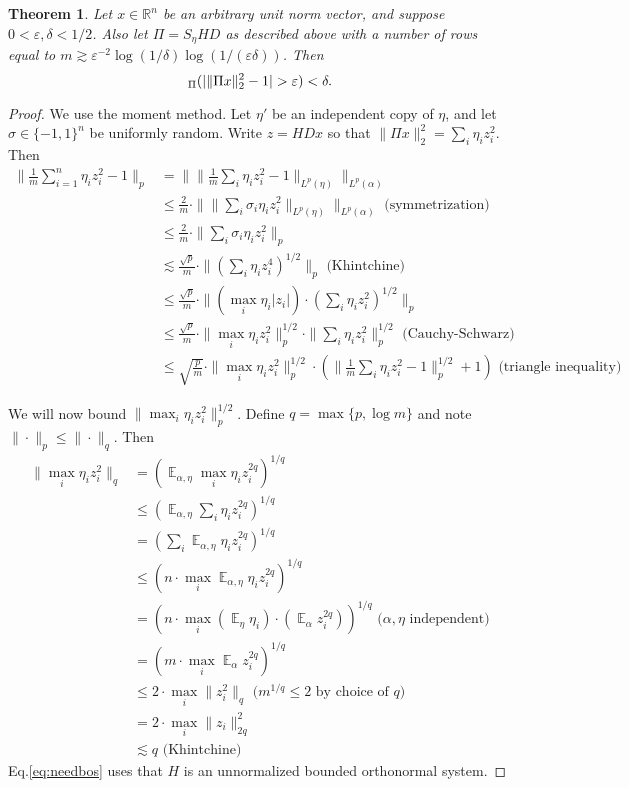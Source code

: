 \documentclass[12pt]{article}
\DeclareMathOperator*{\E}{\mathbb{E}}
\let\Pr\relax
\DeclareMathOperator*{\Pr}{\mathbb{P}}
\newcommand{\eps}{\varepsilon}
\newcommand{\R}{\mathbb{R}}
\newtheorem{theorem}{Theorem}
\newcommand{\EquationName}[1]{\label{eq:#1}}
\newcommand{\TheoremName}[1]{\label{thm:#1}}
\newcommand{\Equation}[1]{Eq.\:\eqref{eq:#1}}
\begin{document}
\begin{theorem}\TheoremName{fjlt}
Let $x\in\R^n$ be an arbitrary unit norm vector, and suppose $0 < \eps, \delta < 1/2$. Also let $\Pi = S_\eta H D$ as described above with a number of rows equal to $m\gtrsim \eps^{-2}\log(1/\delta)\log(1/(\eps\delta))$. Then
$$
\Pr_\Pi(| \|\Pi x\|_2^2 - 1 | > \eps ) < \delta .
$$
\end{theorem}
\begin{proof}
We use the moment method. Let $\eta'$ be an independent copy of $\eta$, and let $\sigma\in\{-1,1\}^n$ be uniformly random. Write $z = HDx$ so that $\|\Pi x\|_2^2 = \sum_i \eta_i z_i^2$. Then
\allowdisplaybreaks
\begin{align}
\|\frac 1m\sum_{i=1}^n \eta_i z_i^2 - 1\|_p &= \|\|\frac 1m\sum_i \eta_i z_i^2 - 1\|_{L^p(\eta)}\|_{L^p(\alpha)} \EquationName{sqrtfjlt1}\\
\nonumber {} &\le \frac 2m\cdot \|\|\sum_i \sigma_i \eta_i z_i^2\|_{L^p(\eta)}\|_{L^p(\alpha)}\text{ (symmetrization)}\\
\nonumber {} &\le \frac 2m\cdot \|\sum_i \sigma_i \eta_i z_i^2\|_p\\
\nonumber {}&\lesssim \frac{\sqrt{p}}m\cdot \|(\sum_i \eta_i z_i^4)^{1/2}\|_p \text{ (Khintchine)}\\
\nonumber {}&\le \frac{\sqrt{p}}m\cdot \|(\max_i \eta_i |z_i|) \cdot (\sum_i \eta_i z_i^2)^{1/2}\|_p\\
\nonumber {}&\le \frac{\sqrt{p}}m\cdot \|\max_i \eta_i z_i^2\|_p^{1/2} \cdot \|\sum_i \eta_i z_i^2\|_p^{1/2}\text{ (Cauchy-Schwarz)}\\
{}&\le \sqrt{\frac pm} \cdot \|\max_i \eta_i z_i^2\|_p^{1/2} \cdot (\|\frac 1m\sum_i \eta_i z_i^2 - 1\|_p^{1/2} + 1)\text{ (triangle inequality)} \EquationName{sqrtfjlt2}
\end{align}

We will now bound $\|\max_i \eta_i z_i^2\|_p^{1/2}$. Define $q = \max\{p, \log m\}$ and note $\|\cdot\|_p \le \|\cdot\|_q$. Then
\begin{align}
\nonumber \|\max_i \eta_i z_i^2\|_q &= \left(\E_{\alpha, \eta}\max_i \eta_i z_i^{2q}\right)^{1/q}\\
\nonumber &\le \left(\E_{\alpha, \eta}\sum_i \eta_i z_i^{2q}\right)^{1/q} \\
\nonumber &= \left(\sum_i \E_{\alpha, \eta} \eta_i z_i^{2q}\right)^{1/q} \\
\nonumber &\le \left(n\cdot \max_i \E_{\alpha, \eta} \eta_i z_i^{2q}\right)^{1/q} \\
\nonumber &= \left(n\cdot \max_i (\E_{\eta} \eta_i)\cdot (\E_\alpha z_i^{2q})\right)^{1/q} \text{ (}\alpha, \eta\text{ independent)}\\
\nonumber &= \left(m\cdot \max_i \E_\alpha z_i^{2q}\right)^{1/q}\\
\nonumber {}&\le 2\cdot \max_i \| z_i^2 \|_q\text{ (}m^{1/q} \le 2\text{ by choice of }q\text{)}\\
\nonumber {}&= 2\cdot \max_i\|z_i\|_{2q}^2\\
{}&\lesssim q \text{ (Khintchine)} \EquationName{needbos}
\end{align}
\Equation{needbos} uses that $H$ is an unnormalized bounded orthonormal system.


\end{proof}
\end{document}
